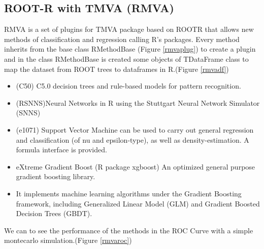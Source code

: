 \documentclass[a4paper]{jpconf}
\begin{document}
\subsection{ROOT-R with TMVA (RMVA)}\label{RMVA}
RMVA is a set of plugins for TMVA package based on ROOTR
that allows new methods of classification and regression calling
R's packages.
Every method inherits from the base class RMethodBase (Figure \ref{rmvaplug})
to create a plugin and in the class RMethodBase is created some objects of TDataFrame class to map
the dataset from ROOT trees to dataframes in R.(Figure \ref{rmvadf}) 
\begin{itemize}  
\item (C50) C5.0 decision trees and rule-based models for pattern
recognition.
\item (RSNNS)Neural Networks in R using the Stuttgart Neural
Network Simulator (SNNS)
\item (e1071) Support Vector Machine can be used to carry out
general regression and classification (of nu and epsilon-type),
as well as density-estimation. A formula interface is provided.
\item eXtreme Gradient Boost (R package xgboost) An optimized
general purpose gradient boosting library.
\item It implements machine learning algorithms under the Gradient
Boosting framework, including Generalized Linear Model (GLM)
and Gradient Boosted Decision Trees (GBDT). 
\end{itemize}

We can to see the performance of the methods in the ROC Curve with a simple montecarlo simulation.(Figure \ref{rmvaroc})
\end{document}
